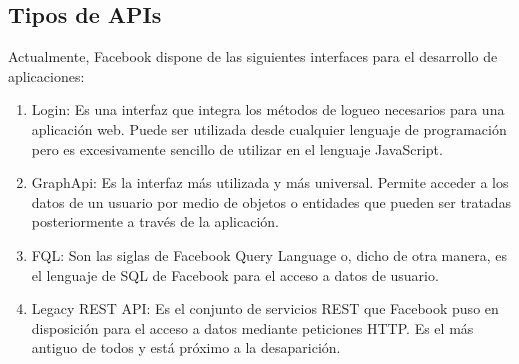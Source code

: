 \subsection{Tipos de APIs}
Actualmente, Facebook dispone de las siguientes interfaces para el desarrollo de
aplicaciones:
\begin{enumerate}
\item Login: Es una interfaz que integra los métodos de logueo necesarios para una aplicación web. Puede ser utilizada desde cualquier lenguaje de programación pero es excesivamente sencillo de utilizar en el lenguaje JavaScript.
\item GraphApi: Es la interfaz más utilizada y más universal. Permite acceder a los datos de un usuario por medio de objetos o entidades que pueden ser tratadas posteriormente a través de la aplicación.
\item FQL: Son las siglas de Facebook Query Language o, dicho de otra manera, es el lenguaje de SQL de Facebook para el acceso a datos de usuario.
\item Legacy REST API: Es el conjunto de servicios REST que Facebook puso en
disposición para el acceso a datos mediante peticiones HTTP. Es el más antiguo de
todos y está próximo a la desaparición.
\end{enumerate} 

